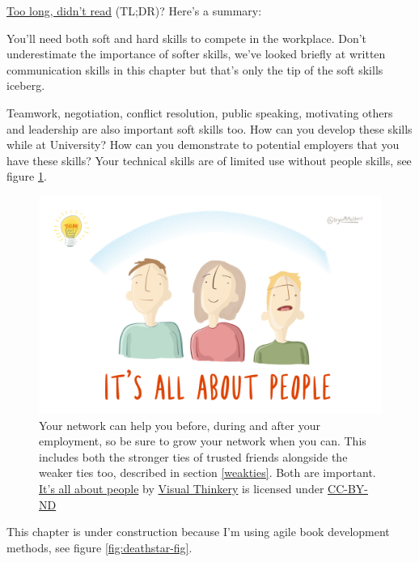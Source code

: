 \documentclass[
]{book}
\begin{document}
\href{https://en.wiktionary.org/wiki/too_long;_didn\%27t_read}{Too long, didn't read} (TL;DR)? Here's a summary:

You'll need both soft and hard skills to compete in the workplace. Don't underestimate the importance of softer skills, we've looked briefly at written communication skills in this chapter but that's only the tip of the soft skills iceberg.

Teamwork, negotiation, conflict resolution, public speaking, motivating others and leadership are also important soft skills too. How can you develop these skills while at University? How can you demonstrate to potential employers that you have these skills? Your technical skills are of limited use without people skills, see figure \ref{fig:allpeople-fig}.

\begin{figure}

{\centering \includegraphics[width=1\linewidth]{images/its-all-about-people-2} 

}

\caption{Your network can help you before, during and after your employment, so be sure to grow your network when you can. This includes both the stronger ties of trusted friends alongside the weaker ties too, described in section \ref{weakties}. Both are important. \href{https://bryanmmathers.com/its-all-about-people/}{It's all about people} by \href{https://visualthinkery.com/}{Visual Thinkery} is licensed under \href{https://creativecommons.org/licenses/by-nd/4.0/}{CC-BY-ND}}\label{fig:allpeople-fig}
\end{figure}



This chapter is under construction because I'm using agile book development methods, see figure \ref{fig:deathstar-fig}.
\end{document}
